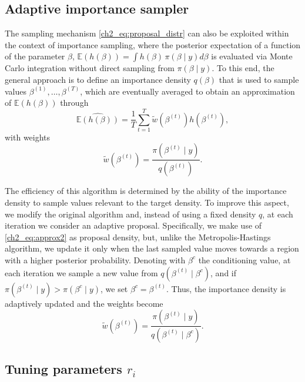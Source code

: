 \subsection{Adaptive importance sampler}
\label{ch2_sec:is}

The sampling mechanism \eqref{ch2_eq:proposal_distr} can also be exploited within the context of importance sampling, where the posterior expectation of a function of the parameter $\beta$, $\mathbb{E}\left( h(\beta) \right) = \int h(\beta)\, \pi(\beta \mid y) d\beta$ is evaluated via Monte Carlo integration without direct sampling from $\pi(\beta \mid y)$. To this end, the general approach is to define an importance density $q(\beta)$ that is used to sample values $\beta^{(1)}, \dots, \beta^{(T)}$, which are eventually averaged to obtain an approximation of $\mathbb{E}\left( h(\beta) \right)$ through
\[
\widehat{\mathbb{E}( h(\beta))} = \frac{1}{T} \sum_{t=1}^T \tilde{w}(\beta^{(t)}) h(\beta^{(t)}),
\]
with weights 
\begin{equation*}
\tilde{w}(\beta^{(t)}) = \frac{\pi(\beta^{(t)} \mid y)}{q(\beta^{(t)})}.
\end{equation*}

The efficiency of this algorithm is determined by the ability of the importance density to sample values relevant to the target density.
To improve this aspect, we modify the original algorithm and, instead of using a fixed density $q$, at each iteration we consider an adaptive proposal. Specifically, we make use of \eqref{ch2_eq:approx2} as proposal density, but, unlike the Metropolis-Hastings algorithm,  we update it only when the last sampled value moves towards a region with a higher posterior probability. Denoting with $\beta^{c}$ the conditioning value, at each iteration we sample a new value from $q(\beta^{(t)}\mid\beta^c)$, and if $\pi(\beta^{(t)}\mid y)>\pi(\beta^{c}\mid y)$, we set $\beta^{c} = \beta^{(t)}$. Thus, the importance density is adaptively updated and the weights become
\begin{equation*}
\tilde{w}(\beta^{(t)}) = \frac{\pi(\beta^{(t)} \mid y)}{q(\beta^{(t)} \mid \beta^{c})}.
\end{equation*}


\subsection{Tuning parameters $r_i$}
\label{sec:tuning_param}


